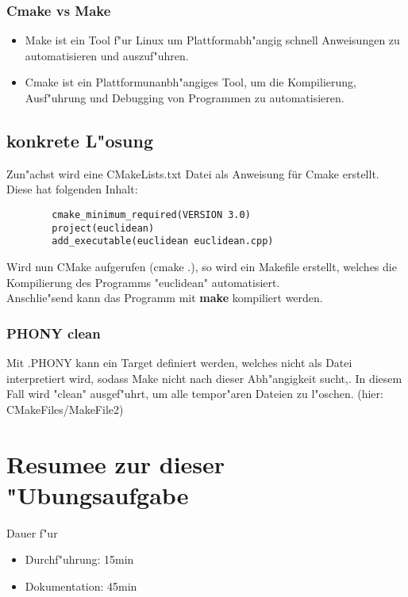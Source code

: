 \documentclass[a4paper,11pt,titlepage]{article}
\begin{document}
    \subsubsection{Cmake vs Make}
    \begin{itemize}
        \item Make ist ein Tool f"ur Linux um Plattformabh"angig schnell Anweisungen zu automatisieren und auszuf"uhren.
        \item Cmake ist ein Plattformunanbh"angiges Tool, um die Kompilierung, Ausf"uhrung und Debugging von Programmen zu automatisieren.
    \end{itemize}

    \subsection{konkrete L"osung}
    Zun"achst wird eine CMakeLists.txt Datei als Anweisung für Cmake erstellt. Diese hat folgenden Inhalt:
    \begin{lstlisting}
        cmake_minimum_required(VERSION 3.0)
        project(euclidean)
        add_executable(euclidean euclidean.cpp)
    \end{lstlisting}

    Wird nun CMake aufgerufen (cmake .), so wird ein Makefile erstellt, welches die Kompilierung des Programms "euclidean" automatisiert. \\
    Anschlie"send kann das Programm mit \textbf{make} kompiliert werden. \\

    \subsubsection{PHONY clean}
    Mit .PHONY kann ein Target definiert werden, welches nicht als Datei interpretiert wird, sodass Make nicht nach dieser Abh"angigkeit sucht,. In diesem Fall wird "clean" ausgef"uhrt, um alle tempor"aren Dateien zu l"oschen. (hier: CMakeFiles/MakeFile2) \\


    \section{Resumee zur dieser "Ubungsaufgabe}
    Dauer f"ur
    \begin{itemize}
        \item Durchf"uhrung: 15min
        \item Dokumentation: 45min
    \end{itemize}
\end{document}
